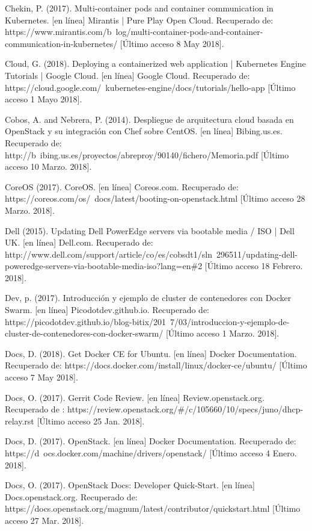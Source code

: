 Chekin, P. (2017). Multi-container pods and container communication in Kubernetes. [en línea] Mirantis | Pure Play Open Cloud. Recuperado de: https://www.mirantis.com/b\ log/multi-container-pods-and-container-communication-in-kubernetes/ [Último acceso 8 May 2018].


Cloud, G. (2018). Deploying a containerized web application  |  Kubernetes Engine Tutorials  |  Google Cloud. [en línea] Google Cloud. Recuperado de: https://cloud.google.com/\ kubernetes-engine/docs/tutorials/hello-app [Último acceso 1 Mayo 2018].


Cobos, A. and Nebrera, P. (2014). Despliegue de arquitectura cloud basada en OpenStack y su integración con Chef sobre CentOS. [en línea] Bibing.us.es. Recuperado de: http://b\ ibing.us.es/proyectos/abreproy/90140/fichero/Memoria.pdf [Último acceso 10 Marzo. 2018].

CoreOS (2017). CoreOS. [en línea] Coreos.com. Recuperado de: https://coreos.com/os/\ docs/latest/booting-on-openstack.html [Último acceso 28 Marzo. 2018].


Dell (2015). Updating Dell PowerEdge servers via bootable media / ISO | Dell UK. [en línea] Dell.com. Recuperado de: http://www.dell.com/support/article/co/es/cobsdt1/sln\ 296511/updating-dell-poweredge-servers-via-bootable-media-iso?lang=en\#2 [Último acceso 18 Febrero. 2018].

Dev, p. (2017). Introducción y ejemplo de cluster de contenedores con Docker Swarm. [en línea] Picodotdev.github.io. Recuperado de: https://picodotdev.github.io/blog-bitix/201\ 7/03/introduccion-y-ejemplo-de-cluster-de-contenedores-con-docker-swarm/ [Último acceso 1 Marzo. 2018].


Docs, D. (2018). Get Docker CE for Ubuntu. [en línea] Docker Documentation. Recuperado de: https://docs.docker.com/install/linux/docker-ce/ubuntu/ [Último acceso 7 May 2018].

Docs, O. (2017). Gerrit Code Review. [en línea] Review.openstack.org. Recuperado de : https://review.openstack.org/\#/c/105660/10/specs/juno/dhcp-relay.rst [Último acceso 25 Jan. 2018].

Docs, D. (2017). OpenStack. [en línea] Docker Documentation. Recuperado de: https://d\ ocs.docker.com/machine/drivers/openstack/ [Último acceso 4 Enero. 2018].

Docs, O. (2017). OpenStack Docs: Developer Quick-Start. [en línea] Docs.openstack.org. Recuperado de: https://docs.openstack.org/magnum/latest/contributor/quickstart.html [Último acceso 27 Mar. 2018].

